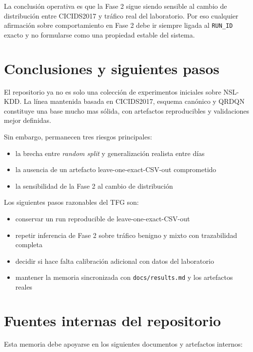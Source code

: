 \documentclass[12pt,a4paper]{report}
\begin{document}
La conclusión operativa es que la Fase 2 sigue siendo sensible al cambio de
distribución entre CICIDS2017 y tráfico real del laboratorio. Por eso cualquier
afirmación sobre comportamiento en Fase 2 debe ir siempre ligada al \texttt{RUN\_ID}
exacto y no formularse como una propiedad estable del sistema.

\chapter{Conclusiones y siguientes pasos}

El repositorio ya no es solo una colección de experimentos iniciales sobre NSL-KDD.
La línea mantenida basada en CICIDS2017, esquema canónico y QRDQN constituye una
base mucho mas sólida, con artefactos reproducibles y validaciones mejor definidas.

Sin embargo, permanecen tres riesgos principales:

\begin{itemize}
    \item la brecha entre \emph{random split} y generalización realista entre días
    \item la ausencia de un artefacto leave-one-exact-CSV-out comprometido
    \item la sensibilidad de la Fase 2 al cambio de distribución
\end{itemize}

Los siguientes pasos razonables del TFG son:

\begin{itemize}
    \item conservar un run reproducible de leave-one-exact-CSV-out
    \item repetir inferencia de Fase 2 sobre tráfico benigno y mixto con trazabilidad completa
    \item decidir si hace falta calibración adicional con datos del laboratorio
    \item mantener la memoria sincronizada con \texttt{docs/results.md} y los artefactos reales
\end{itemize}

\chapter{Fuentes internas del repositorio}

Esta memoria debe apoyarse en los siguientes documentos y artefactos internos:
\end{document}
